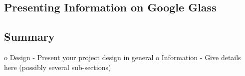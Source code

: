 

\subsection{Presenting Information on Google Glass}
\label{subsec:informationlimitedspace}


\subsection{Summary}
\label{subsec:summary}


o   Design - Present your project design in general
o   Information - Give details here (possibly several sub-sections)

